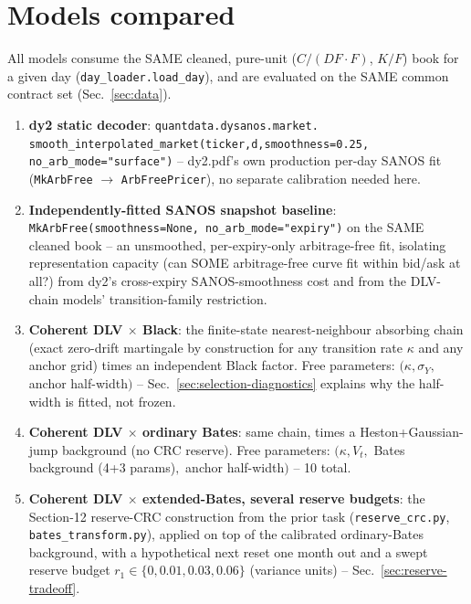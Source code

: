 \section{Models compared}
\label{sec:models}

All models consume the SAME cleaned, pure-unit ($C/(DF{\cdot}F)$, $K/F$)
book for a given day (\texttt{day\_loader.load\_day}), and are evaluated on
the SAME common contract set (Sec.~\ref{sec:data}).

\begin{enumerate}
\item \textbf{dy2 static decoder}: \texttt{quantdata.dysanos.market.}\allowbreak
  \texttt{smooth\_interpolated\_market(ticker,d,smoothness=0.25,}\allowbreak
  \texttt{no\_arb\_mode="surface")} -- dy2.pdf's own production per-day SANOS
  fit (\texttt{MkArbFree} $\to$ \texttt{ArbFreePricer}), no separate
  calibration needed here.
\item \textbf{Independently-fitted SANOS snapshot baseline}:
  \texttt{MkArbFree(smoothness=None, no\_arb\_mode="expiry")} on the SAME
  cleaned book -- an unsmoothed, per-expiry-only arbitrage-free fit,
  isolating representation capacity (can SOME arbitrage-free curve fit
  within bid/ask at all?) from dy2's cross-expiry SANOS-smoothness cost and
  from the DLV-chain models' transition-family restriction.
\item \textbf{Coherent DLV $\times$ Black}: the finite-state
  nearest-neighbour absorbing chain (exact zero-drift martingale by
  construction for any transition rate $\kappa$ and any anchor grid) times
  an independent Black factor. Free parameters: $(\kappa,\sigma_Y,$ anchor
  half-width$)$ -- Sec.~\ref{sec:selection-diagnostics} explains why the
  half-width is fitted, not frozen.
\item \textbf{Coherent DLV $\times$ ordinary Bates}: same chain, times a
  Heston+Gaussian-jump background (no CRC reserve). Free parameters:
  $(\kappa,V_t,$ Bates background (4+3 params)$,$ anchor half-width$)$ --
  10 total.
\item \textbf{Coherent DLV $\times$ extended-Bates, several reserve
  budgets}: the Section-12 reserve-CRC construction from the prior task
  (\texttt{reserve\_crc.py}, \texttt{bates\_transform.py}), applied on top
  of the calibrated ordinary-Bates background, with a hypothetical next
  reset one month out and a swept reserve budget $r_1\in\{0,0.01,0.03,0.06\}$
  (variance units) -- Sec.~\ref{sec:reserve-tradeoff}.
\end{enumerate}


